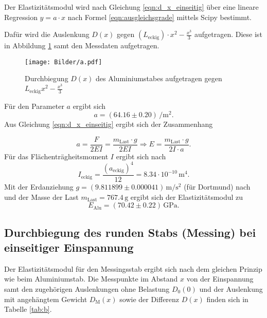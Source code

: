 Der Elastizitätsmodul wird nach Gleichung \eqref{eqn:d_x_einseitig} über eine lineare Regression $y= a\cdot x$ nach Formel \eqref{eqn:ausgleichsgrade} mittels Scipy \cite{scipy} bestimmt.

Dafür wird die Auslenkung $D(x)$ gegen $(L_{\mathrm{eckig}})\cdot x^2-\frac{x^3}{3}$ aufgetragen.
Diese ist in Abbildung \ref{fig:Alu_einseitig} samt den Messdaten aufgetragen.
\begin{figure}
	\centering
	\texttt{[image: Bilder/a.pdf]}
	\caption{Durchbiegung $D(x)$ des Aluminiumstabes aufgetragen gegen $L_{\mathrm{eckig}}x^2-\frac{x^3}{3}$}
	\label{fig:Alu_einseitig}
\end{figure}
Für den Parameter $a$ ergibt sich
\begin{equation*}
	a=(64.16\pm 0.20) \,\si{\per\square\meter}  \text{.}
\end{equation*}
Aus Gleichung \eqref{eqn:d_x_einseitig} ergibt sich der Zusammenhang

\begin{equation}
	a= \frac{F}{2EI}=\frac{m_{\mathrm{Last}}\cdot g}{2EI} \Rightarrow E=\frac{m_{\mathrm{Last}}\cdot g}{2I\cdot a} \text{.}
\end{equation}
Für das Flächenträgheitsmoment $I$ ergibt sich nach \cite{bla}
\begin{equation}
	I_{\mathrm{eckig}}=\frac{(a_{\mathrm{eckig}})^4}{12}= 8.34 \cdot 10^{-10} \,\si{\meter\tothe{4}}	 \text{.}
\end{equation}
Mit der Erdanziehung $g=(9.811899 \pm 0.000041) \,\si{\meter\per\square\second}$ (für Dortmund) nach \cite{G} und der Masse der Last $m_{\mathrm{Last}}=767.4\,\si{\gram}$ ergibt sich der Elastizitätsmodul zu
\begin{equation*}
	E_{\mathrm{Alu}}= (70.42 \pm 0.22)\,\si{\giga\pascal} \text{.}
\end{equation*}
\FloatBarrier
\subsection{Durchbiegung des runden Stabs (Messing) bei einseitiger Einspannung}
Der Elastizitätsmodul für den Messingsstab ergibt sich nach dem gleichen Prinzip wie beim Aluminiumstab.
Die Messpunkte im Abstand $x$ von der Einspannung samt den zugehörigen Auslenkungen ohne Belastung $D_{\mathrm{0}}(0)$
und der Auslenkung mit angehängtem Gewicht $D_{\mathrm{M}}(x)$ sowie der Differenz $D(x)$ finden sich in Tabelle \ref{tab:b}.

